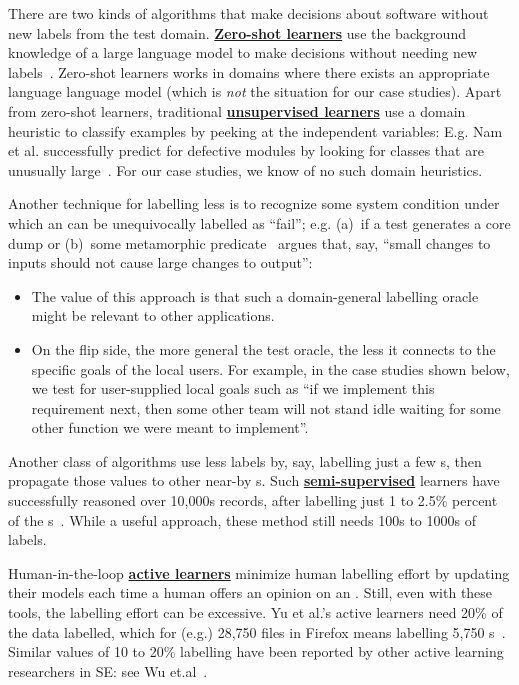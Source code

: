 There are two kinds of algorithms that make decisions about software without   new labels from the test domain.
 \underline{\bf  Zero-shot learners} use  the  background knowledge of a large language model to make decisions without needing new labels~\cite{alhoshan2022zero}.
 Zero-shot learners  works in domains where there exists an
  appropriate language language model (which is {\em not}
  the situation for our case studies).
Apart from zero-shot learners,
 traditional  \underline{\bf unsupervised learners} use a domain heuristic to classify examples by 
 peeking at the independent variables:
 E.g. Nam et al. successfully predict for defective modules by looking for classes that are unusually large~\cite{nam2015clami}.  For our case studies, we know of no such domain heuristics.

 Another technique for labelling less is to recognize  some system condition
 under which an {\eg}
can be unequivocally labelled as ``fail''; e.g. (a)~if a test generates a core dump or (b)~some metamorphic predicate~\cite{chen2018metamorphic} argues that, say, ``small changes to inputs should not cause large changes to 
output'':
\begin{itemize} 
\item The value of this approach is that such a domain-general labelling
oracle  might be relevant to other applications.
\item On the flip side, the more general the test oracle, the less it connects
to the specific goals of the local users.
 For example, in the case studies shown below, we test for user-supplied 
 local goals such as ``if we implement this requirement next, then some other team will not stand idle waiting for some other function we were meant to implement''.
 \end{itemize} 
 Another class of algorithms use less labels by, say,    labelling just a few {\eg}s,  then propagate those values to other near-by {\eg}s.
Such  \underline{\bf semi-supervised} learners have successfully reasoned over 10,000s   records, after labelling just 1 to 2.5\% percent of the {\eg}s~\cite{10109333,majumder2024less}.
While a useful approach, these method   still needs 
100s to 1000s  of labels. 

Human-in-the-loop   \underline{\bf  active learners}  
minimize human labelling effort by updating their models
each time a human offers an opinion on an {\eg}.
Still, even with these tools, the labelling effort can be excessive.
Yu et al.'s active learners need 20\% of the data
labelled, which for (e.g.) 28,750 files in Firefox means labelling 5,750 {\eg}s~\cite{yu2019fast2}. Similar values of 10 to 20\% labelling
have been reported by other active learning researchers in SE:
see   Wu et.al~\cite{WU2021106530}.

